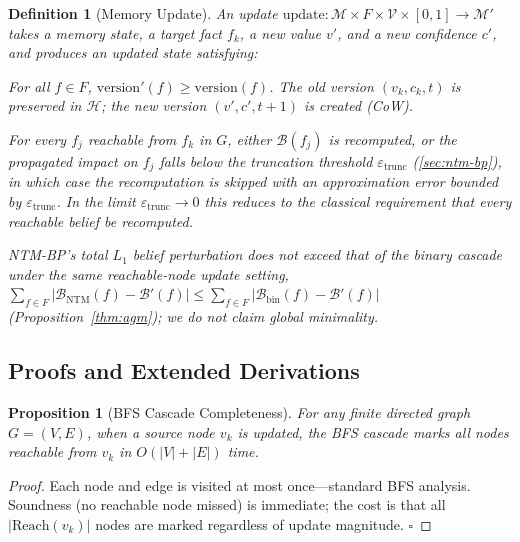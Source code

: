 \documentclass{article}
\newtheorem{definition}[theorem]{Definition}
\newtheorem{proposition}[theorem]{Proposition}
\theoremstyle{definition}
\begin{document}
\begin{definition}[Memory Update]
\label{def:update}
An update $\text{update}: \mathcal{M}\times F\times\mathcal{V}\times[0,1]
\to\mathcal{M}'$ takes a memory state, a target fact $f_k$, a new
value $v'$, and a new confidence $c'$, and produces an updated state
satisfying:
\begin{description}[style=nextline, leftmargin=1.8cm, labelwidth=1.5cm,
  labelsep=0.3cm, font=\normalfont\bfseries, itemsep=4pt, topsep=4pt]
\item[(Versioning)] For all $f\in F$,
  $\text{version}'(f) \geq \text{version}(f)$.
  The old version $(v_k, c_k, t)$ is
  preserved in $\mathcal{H}$; the new version $(v', c', t+1)$ is
  created (CoW).
\item[(Dependency Completeness, probabilistic)] For every $f_j$
  reachable from $f_k$ in $G$, either $\mathcal{B}(f_j)$ is recomputed,
  or the propagated impact on $f_j$ falls below the truncation threshold
  $\varepsilon_{\text{trunc}}$ (\cref{sec:ntm-bp}), in which
  case the recomputation is skipped with an approximation error bounded
  by $\varepsilon_{\text{trunc}}$. In the limit
  $\varepsilon_{\text{trunc}}\to 0$ this reduces to the classical
  requirement that every reachable belief be recomputed.
\item[(Bounded Perturbation)] NTM-BP's total $L_1$ belief perturbation
  does not exceed that of the binary cascade under the same
  reachable-node update setting,
  $\sum_{f\in F}|\mathcal{B}_{\text{NTM}}(f)-\mathcal{B}'(f)|
  \leq \sum_{f\in F}|\mathcal{B}_{\text{bin}}(f)-\mathcal{B}'(f)|$
  (Proposition~\ref{thm:agm}); we do not claim global minimality.
\end{description}
\end{definition}

\subsection{Proofs and Extended Derivations}
\label{app:formal-proofs}

\begin{proposition}[BFS Cascade Completeness]
\label{thm:bfs}
For any finite directed graph $G=(V,E)$, when a source node $v_k$ is
updated, the BFS cascade marks all nodes reachable from $v_k$ in
$O(|V|+|E|)$ time.
\end{proposition}
\begin{proof}
Each node and edge is visited at most once---standard BFS analysis.
Soundness (no reachable node missed) is immediate; the cost is that all
$|\text{Reach}(v_k)|$ nodes are marked regardless of update magnitude.
\hfill$\square$
\end{proof}
\end{document}
